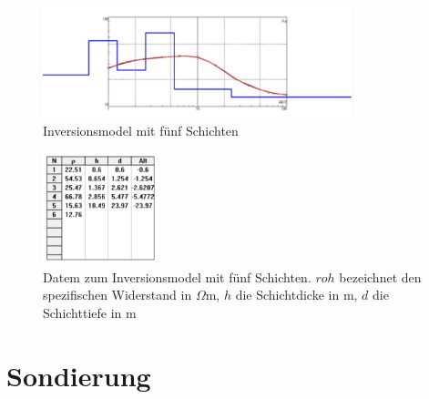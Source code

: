 \begin{figure}[h]
\centering
\includegraphics[width=0.8\textwidth]{fig/Schlumberger_5Schichten.pdf}
\caption{Inversionsmodel mit fünf Schichten}
\label{abb:Schlum2}
\end{figure}
\begin{figure}[h]
\centering
\includegraphics[width=0.3\textwidth]{fig/schlumbergerTabelle2.pdf}
\caption{Datem zum Inversionsmodel mit fünf Schichten. $roh$ bezeichnet den spezifischen Widerstand in $\Omega$m, $h$ die Schichtdicke in m, $d$ die Schichttiefe in m}
\label{abb:SchlumTab2}
\end{figure}






\section{Sondierung}

